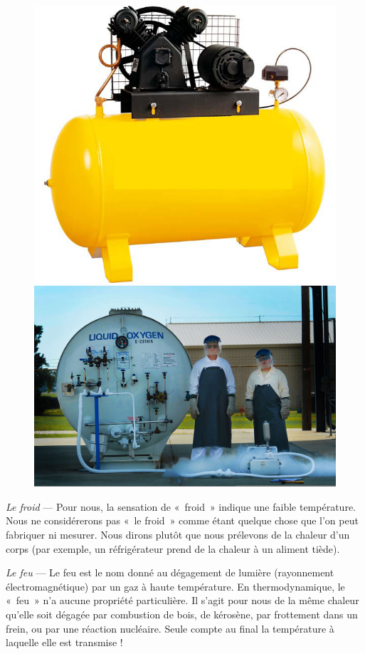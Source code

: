 \begin{description}
		\begin{figure}
			\begin{center}
			\includegraphics[height=0.38\textwidth]{images/air_piston_compressor.jpg}
			\includegraphics[height=0.38\textwidth]{images/liquid_oxygen_expansion.jpg}
			\end{center}
			\label{fig_chauffer_refroidir}
		\end{figure}
			
			\item \textit{Le froid} --- Pour nous, la sensation de «~froid~» indique une faible température. Nous ne considérerons pas «~le froid~» comme étant quelque chose que l’on peut fabriquer ni mesurer. Nous dirons plutôt que nous prélevons de la chaleur d’un corps (par exemple, un réfrigérateur prend de la chaleur à un aliment tiède). 
			
			\item \textit{Le feu} --- Le feu est le nom donné au dégagement de lumière (rayonnement électromagnétique) par un gaz à haute température. En thermodynamique, le «~feu~» n’a aucune propriété particulière. Il s’agit pour nous de la même chaleur qu’elle soit dégagée par combustion de bois, de kérosène, par frottement dans un frein, ou par une réaction nucléaire. Seule compte au final la température à laquelle elle est transmise !
			\end{description}

